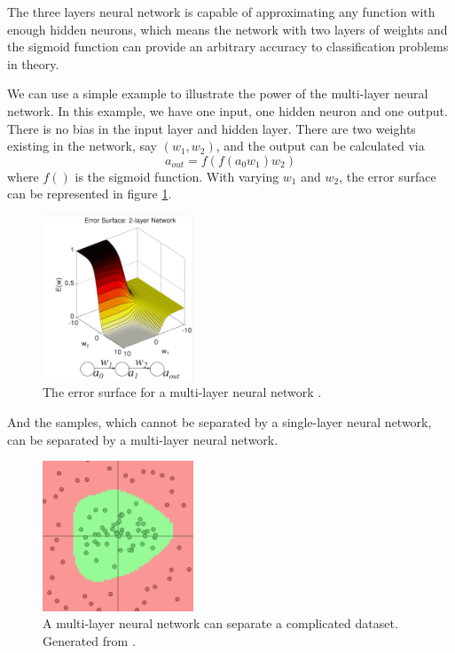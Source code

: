 The three layers neural network is capable of approximating any function with enough hidden neurons, which means the network with two layers of weights and the sigmoid function can provide an arbitrary accuracy to classification problems in theory. 

We can use a simple example to illustrate the power of the multi-layer neural network. In this example, we have one input, one hidden neuron and one output. There is no bias in the input layer and hidden layer. There are two weights existing in the network, say $(w_{1}, w_{2})$, and the output can be calculated via
\begin{equation}\label{eq:2LayerExample}
a_{out} = f(f(a_{0}w_{1})w_{2})
\end{equation}
where $f()$ is the sigmoid function. With varying $w_{1}$ and $w_{2}$, the error surface can be represented in figure \ref{fig:2LayerErrorSurface}.
\graphicspath{ {./Figures/} }
\begin{figure}[!htb]
\centering
\includegraphics[width=0.4\textwidth]{2LayerErrorSurface.png}
\caption{\label{fig:2LayerErrorSurface}The error surface for a multi-layer neural network \citep{ErrorFigure1}.}
\end{figure}
And the samples, which cannot be separated by a single-layer neural network, can be separated by a multi-layer neural network.
\graphicspath{ {./Figures/} }
\begin{figure}[!htb]
\centering
\includegraphics[width=0.4\textwidth]{MultiLayerCircleData.png}
\caption{\label{fig:MultiLayerErrorSurface}A multi-layer neural network can separate a complicated dataset. Generated from \citep{GenerateNN}.}
\end{figure}

